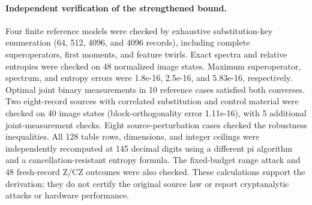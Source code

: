 \paragraph{Independent verification of the strengthened bound.}
Four finite reference models were checked by exhaustive substitution-key enumeration (64, 512, 4096, and 4096 records), including complete superoperators, first moments, and feature twirls. Exact spectra and relative entropies were checked on 48 normalized image states. Maximum superoperator, spectrum, and entropy errors were 1.8e-16, 2.5e-16, and 5.83e-16, respectively. Optimal joint binary measurements in 10 reference cases satisfied both converses. Two eight-record sources with correlated substitution and control material were checked on 40 image states (block-orthogonality error 1.11e-16), with 5 additional joint-measurement checks. Eight source-perturbation cases checked the robustness inequalities. All 128 table rows, dimensions, and integer ceilings were independently recomputed at 145 decimal digits using a different pi algorithm and a cancellation-resistant entropy formula. The fixed-budget range attack and 48 fresh-record Z/CZ outcomes were also checked. These calculations support the derivation; they do not certify the original source law or report cryptanalytic attacks or hardware performance.
